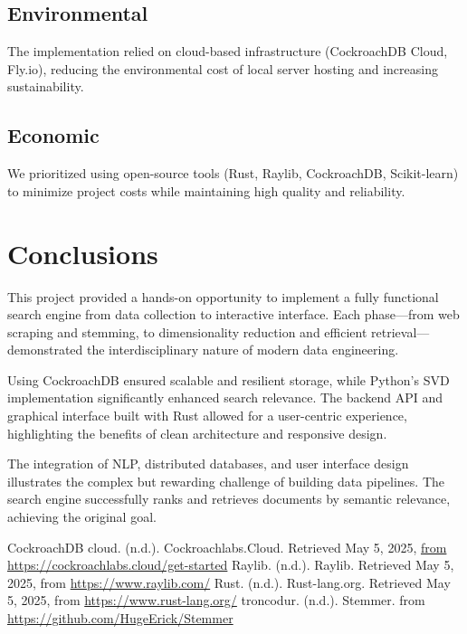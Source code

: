 \documentclass[twoside]{article}
\begin{document}
\subsection{Environmental}
The implementation relied on cloud-based infrastructure (CockroachDB Cloud, Fly.io), reducing the environmental cost of local server hosting and increasing sustainability.

\subsection{Economic}
We prioritized using open-source tools (Rust, Raylib, CockroachDB, Scikit-learn) to minimize project costs while maintaining high quality and reliability.


\section{Conclusions}
This project provided a hands-on opportunity to implement a fully functional search engine from data collection to interactive interface. Each phase—from web scraping and stemming, to dimensionality reduction and efficient retrieval—demonstrated the interdisciplinary nature of modern data engineering.

Using CockroachDB ensured scalable and resilient storage, while Python’s SVD implementation significantly enhanced search relevance. The backend API and graphical interface built with Rust allowed for a user-centric experience, highlighting the benefits of clean architecture and responsive design.

The integration of NLP, distributed databases, and user interface design illustrates the complex but rewarding challenge of building data pipelines. The search engine successfully ranks and retrieves documents by semantic relevance, achieving the original goal.

\begin{thebibliography}{9}
  CockroachDB cloud. (n.d.). Cockroachlabs.Cloud. Retrieved May 5, 2025, \url{from https://cockroachlabs.cloud/get-started}
  Raylib. (n.d.). Raylib. Retrieved May 5, 2025, from \url{https://www.raylib.com/}
  Rust. (n.d.). Rust-lang.org. Retrieved May 5, 2025, from \url{https://www.rust-lang.org/}
  troncodur. (n.d.). Stemmer. from \url{https://github.com/HugeErick/Stemmer}
\end{thebibliography}
\end{document}
